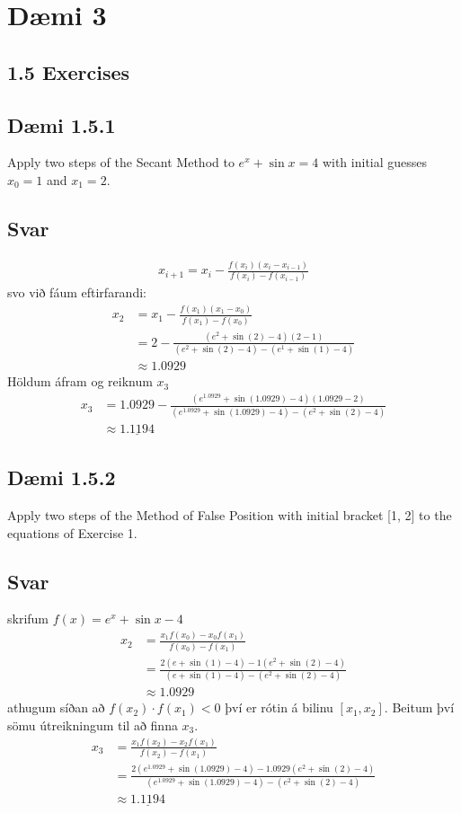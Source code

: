 \documentclass[11pt]{article}
\begin{document}
\newpage
\section*{Dæmi 3}
\subsection*{1.5 Exercises}

\subsection*{Dæmi 1.5.1}

Apply two steps of the Secant Method to $e^x + \sin x = 4$ with initial guesses $x_0=1$ and $x_1=2.$
\subsection*{Svar}


\begin{align*}
x_{i+1} = x_i - \frac{f(x_i)(x_i-x_{i-1})}{f(x_i)-f(x_{i-1})}
\end{align*}
svo við fáum eftirfarandi:
\begin{align*}
x_2 &= x_1 - \frac{f(x_1)(x_1-x_0)}{f(x_1)-f(x_0)}\\
	&= 2 - \frac{(e^2+\sin(2)-4)(2-1)}{(e^2+\sin(2)-4)-(e^1+\sin(1)-4)}\\
    &\approx 1.0929
\end{align*}
Höldum áfram og reiknum $x_3$
\begin{align*}
x_3 &= 1.0929 - \frac{(e^{1.0929}+\sin(1.0929)-4)(1.0929-2)}{(e^{1.0929}+\sin(1.0929)-4)-(e^2+\sin(2)-4)}\\
	&\approx \underline{1.1194}
\end{align*}




\subsection*{Dæmi 1.5.2}
Apply two steps of the Method of False Position with initial bracket [1, 2] to the equations of
Exercise 1.
\subsection*{Svar}
skrifum $f(x) = e^x + \sin x -4$
\begin{align*}
x_2 &= \frac{x_1f(x_0)-x_0f(x_1)}{f(x_0)-f(x_1)}\\
	&= \frac{2(e+\sin(1)-4)-1(e^2+\sin(2)-4)}{(e+\sin(1)-4)-(e^2+\sin(2)-4)}\\
    &\approx 1.0929
\end{align*}
athugum síðan að $f(x_2)\cdot f(x_1) < 0$ því er rótin á bilinu $[x_1, x_2]$. Beitum því sömu útreikningum til að finna $x_3$.
\begin{align*}
x_3 &= \frac{x_1f(x_2)-x_2f(x_1)}{f(x_2)-f(x_1)}\\
	&= \frac{2(e^{1.0929}+\sin(1.0929)-4)-1.0929(e^2+\sin(2)-4)}{(e^{1.0929}+\sin(1.0929)-4)-(e^2+\sin(2)-4)}\\
	&\approx \underline{1.1194}
\end{align*}
\end{document}
